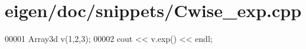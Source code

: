 \hypertarget{eigen_2doc_2snippets_2_cwise__exp_8cpp_source}{}\section{eigen/doc/snippets/\+Cwise\+\_\+exp.cpp}
\label{eigen_2doc_2snippets_2_cwise__exp_8cpp_source}

\begin{DoxyCode}
00001 Array3d v(1,2,3);
00002 cout << v.exp() << endl;
\end{DoxyCode}
